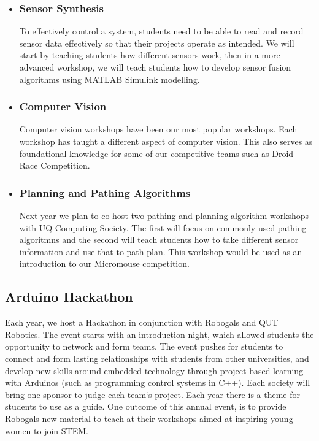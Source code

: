 \documentclass[a4paper,12pt]{report}
\begin{document}
\begin{itemize}
    \item \subsubsection*{Sensor Synthesis}
    To effectively control a system, students need to be able to read and record sensor data effectively so that their projects operate as intended.
    We will start by teaching students how different sensors work, then in a more advanced workshop, we will teach students how to develop sensor fusion algorithms using MATLAB Simulink modelling.
    \item \subsubsection*{Computer Vision}
    Computer vision workshops have been our most popular workshops.
    Each workshop has taught a different aspect of computer vision.
    This also serves as foundational knowledge for some of our competitive teams such as Droid Race Competition.
    \item \subsubsection*{Planning and Pathing Algorithms}
    Next year we plan to co-host two pathing and planning algorithm workshops with UQ Computing Society.
    The first will focus on commonly used pathing algoritmns and the second will teach students how to take different sensor information and use that to path plan.
    This workshop would be used as an introduction to our Micromouse competition.
\end{itemize}

\newpage

\subsection*{Arduino Hackathon}
Each year, we host a Hackathon in conjunction with Robogals and QUT Robotics.
The event starts with an introduction night, which allowed students the opportunity to network and form teams.
The event pushes for students to connect and form lasting relationships with students from other universities, and develop new skills around embedded technology through project-based learning with Arduinos (such as programming control systems in C++).
Each society will bring one sponsor to judge each team`s project. Each year there is a theme for students to use as a guide.
One outcome of this annual event, is to provide Robogals new material to teach at their workshops aimed at inspiring young women to join STEM.
\end{document}

